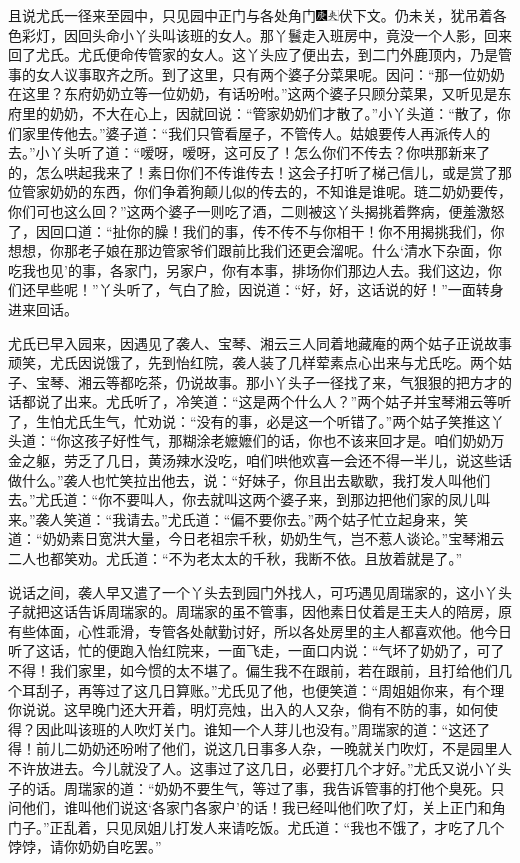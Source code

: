 且说尤氏一径来至园中，只见园中正门与各处角门{\includegraphics[width=3mm]{../Images/00004}\includegraphics[width=3mm]{../Images/00012}\footnotesize \kaishu 伏下文。}仍未关，犹吊着各色彩灯，因回头命小丫头叫该班的女人。那丫鬟走入班房中，竟没一个人影，回来回了尤氏。尤氏便命传管家的女人。这丫头应了便出去，到二门外鹿顶内，乃是管事的女人议事取齐之所。到了这里，只有两个婆子分菜果呢。因问：“那一位奶奶在这里？东府奶奶立等一位奶奶，有话吩咐。”这两个婆子只顾分菜果，又听见是东府里的奶奶，不大在心上，因就回说：“管家奶奶们才散了。”小丫头道：“散了，你们家里传他去。”婆子道：“我们只管看屋子，不管传人。姑娘要传人再派传人的去。”小丫头听了道：“嗳呀，嗳呀，这可反了！怎么你们不传去？你哄那新来了的，怎么哄起我来了！素日你们不传谁传去！这会子打听了梯己信儿，或是赏了那位管家奶奶的东西，你们争着狗颠儿似的传去的，不知谁是谁呢。琏二奶奶要传，你们可也这么回？”这两个婆子一则吃了酒，二则被这丫头揭挑着弊病，便羞激怒了，因回口道：“扯你的臊！我们的事，传不传不与你相干！你不用揭挑我们，你想想，你那老子娘在那边管家爷们跟前比我们还更会溜呢。什么‘清水下杂面，你吃我也见’的事，各家门，另家户，你有本事，排场你们那边人去。我们这边，你们还早些呢！”丫头听了，气白了脸，因说道：“好，好，这话说的好！”一面转身进来回话。

尤氏已早入园来，因遇见了袭人、宝琴、湘云三人同着地藏庵的两个姑子正说故事顽笑，尤氏因说饿了，先到怡红院，袭人装了几样荤素点心出来与尤氏吃。两个姑子、宝琴、湘云等都吃茶，仍说故事。那小丫头子一径找了来，气狠狠的把方才的话都说了出来。尤氏听了，冷笑道：“这是两个什么人？”两个姑子并宝琴湘云等听了，生怕尤氏生气，忙劝说：“没有的事，必是这一个听错了。”两个姑子笑推这丫头道：“你这孩子好性气，那糊涂老嬷嬷们的话，你也不该来回才是。咱们奶奶万金之躯，劳乏了几日，黄汤辣水没吃，咱们哄他欢喜一会还不得一半儿，说这些话做什么。”袭人也忙笑拉出他去，说：“好妹子，你且出去歇歇，我打发人叫他们去。”尤氏道：“你不要叫人，你去就叫这两个婆子来，到那边把他们家的凤儿叫来。”袭人笑道：“我请去。”尤氏道：“偏不要你去。”两个姑子忙立起身来，笑道：“奶奶素日宽洪大量，今日老祖宗千秋，奶奶生气，岂不惹人谈论。”宝琴湘云二人也都笑劝。尤氏道：“不为老太太的千秋，我断不依。且放着就是了。”

说话之间，袭人早又遣了一个丫头去到园门外找人，可巧遇见周瑞家的，这小丫头子就把这话告诉周瑞家的。周瑞家的虽不管事，因他素日仗着是王夫人的陪房，原有些体面，心性乖滑，专管各处献勤讨好，所以各处房里的主人都喜欢他。他今日听了这话，忙的便跑入怡红院来，一面飞走，一面口内说：“气坏了奶奶了，可了不得！我们家里，如今惯的太不堪了。偏生我不在跟前，若在跟前，且打给他们几个耳刮子，再等过了这几日算账。”尤氏见了他，也便笑道：“周姐姐你来，有个理你说说。这早晚门还大开着，明灯亮烛，出入的人又杂，倘有不防的事，如何使得？因此叫该班的人吹灯关门。谁知一个人芽儿也没有。”周瑞家的道：“这还了得！前儿二奶奶还吩咐了他们，说这几日事多人杂，一晚就关门吹灯，不是园里人不许放进去。今儿就没了人。这事过了这几日，必要打几个才好。”尤氏又说小丫头子的话。周瑞家的道：“奶奶不要生气，等过了事，我告诉管事的打他个臭死。只问他们，谁叫他们说这‘各家门各家户’的话！我已经叫他们吹了灯，关上正门和角门子。”正乱着，只见凤姐儿打发人来请吃饭。尤氏道：“我也不饿了，才吃了几个饽饽，请你奶奶自吃罢。”


